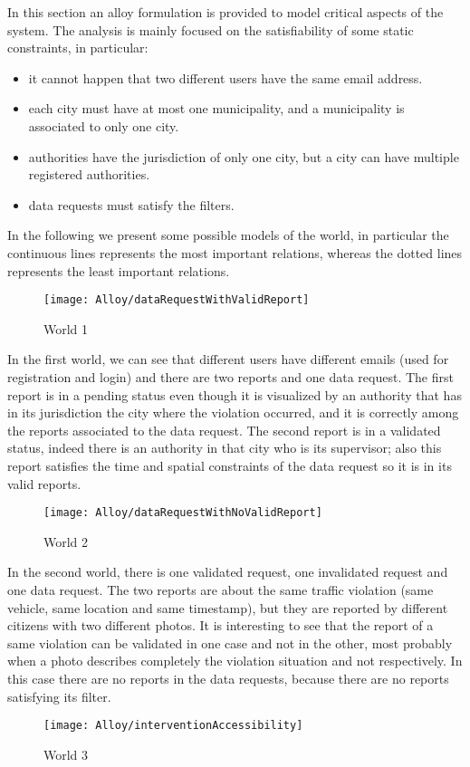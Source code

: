 In this section an alloy formulation is provided to model critical aspects of the system. The analysis is mainly focused on the satisfiability of some static constraints, in particular:
\begin{itemize}
	\item it cannot happen that two different users have the same email address.
	\item each city must have at most one municipality, and a municipality is associated to only one city.
	\item authorities have the jurisdiction of only one city, but a city can have multiple registered authorities.
	\item data requests must satisfy the filters.
\end{itemize}

\vspace{10mm}


In the following we present some possible models of the world, in particular the continuous lines represents the most important relations, whereas the dotted lines represents the least important relations.
\begin{figure}[H]
	\centering
	\texttt{[image: Alloy/dataRequestWithValidReport]}
	\caption{World 1}
\end{figure}
In the first world, we can see that different users have different emails (used for registration and login) and there are two reports and one data request. The first report is in a pending status even though it is visualized by an authority that has in its jurisdiction the city where the violation occurred, and it is correctly among the reports associated to the data request. The second report is in a validated status, indeed there is an authority in that city who is its supervisor; also this report satisfies the time and spatial constraints of the data request so it is in its valid reports.
\begin{figure}[H]
	\centering
	\texttt{[image: Alloy/dataRequestWithNoValidReport]}
	\caption{World 2}
\end{figure}
In the second world, there is one validated request, one invalidated request and one data request. The two reports are about the same traffic violation (same vehicle, same location and same timestamp), but they are reported by different citizens with two different photos. It is interesting to see that the report of a same violation can be validated in one case and not in the other, most probably when a photo describes completely the violation situation and not respectively. In this case there are no reports in the data requests, because there are no reports satisfying its filter.
\begin{figure}[H]
	\centering
	\texttt{[image: Alloy/interventionAccessibility]}
	\caption{World 3}
\end{figure}

